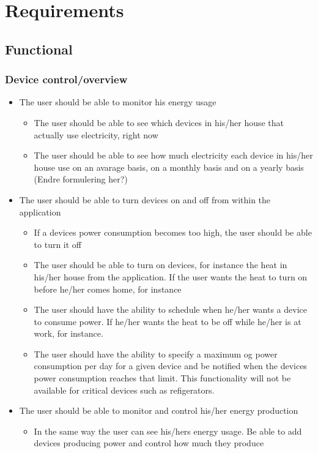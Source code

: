 \section{Requirements}
\subsection{Functional}

\subsubsection{Device control/overview}
\begin{itemize}
\item The user should be able to monitor his energy usage
\begin{itemize}
\item The user should be able to see which devices in his/her house that actually use electricity, right now
\item The user should be able to see how much electricity each device in his/her house use on an avarage basis, on a monthly basis and on a yearly basis (Endre formulering her?)
\end{itemize}

\item The user should be able to turn devices on and off from within the application
\begin{itemize}
\item If a devices power consumption becomes too high, the user should be able to turn it off
\item The user should be able to turn on devices, for instance the heat in his/her house from the application. If the user wants the heat to turn on before he/her comes home, for instance
\item The user should have the ability to schedule when he/her wants a device to consume power. If he/her wants the heat to be off while he/her is at work, for instance. 
\item The user should have the ability to specify a maximum og power 
consumption per day for a given device and be notified when the devices power
consumption reaches that limit. This functionality will not be available
for critical devices such as refigerators. 
\end{itemize}

\item The user should be able to monitor and control his/her energy production
\begin{itemize}
\item In the same way the user can see his/hers energy usage. Be able to add devices producing power and control how much they produce
\end{itemize}


\end{itemize}
